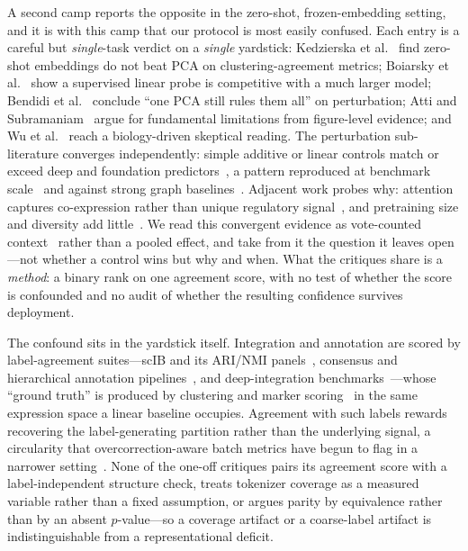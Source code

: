 \documentclass[fleqn,10pt,lineno]{wlpeerj}  %
\begin{document}
A second camp reports the opposite in the zero-shot, frozen-embedding setting, and it is with this camp that our protocol is most easily confused. Each entry is a careful but \emph{single}-task verdict on a \emph{single} yardstick: Kedzierska et al.~\cite{kedzierska2025} find zero-shot embeddings do not beat PCA on clustering-agreement metrics; Boiarsky et al.~\cite{boiarsky2024} show a supervised linear probe is competitive with a much larger model; Bendidi et al.~\cite{bendidi2024} conclude ``one PCA still rules them all'' on perturbation; Atti and Subramaniam~\cite{atti2025} argue for fundamental limitations from figure-level evidence; and Wu et al.~\cite{wu2025} reach a biology-driven skeptical reading. The perturbation sub-literature converges independently: simple additive or linear controls match or exceed deep and foundation predictors~\cite{wongpfizer2025,kernfeld2025,csendes2025,ahlmann2025}, a pattern reproduced at benchmark scale~\cite{perteval2024,scperturbench2025,systema2026} and against strong graph baselines~\cite{roohani2024}. Adjacent work probes why: attention captures co-expression rather than unique regulatory signal~\cite{kendiukhov2026}, and pretraining size and diversity add little~\cite{denadel2026}. We read this convergent evidence as vote-counted context~\cite{borenstein2009} rather than a pooled effect, and take from it the question it leaves open---not whether a control wins but why and when. What the critiques share is a \emph{method}: a binary rank on one agreement score, with no test of whether the score is confounded and no audit of whether the resulting confidence survives deployment.

The confound sits in the yardstick itself. Integration and annotation are scored by label-agreement suites---scIB and its ARI/NMI panels~\cite{luecken2022}, consensus and hierarchical annotation pipelines~\cite{popv2024,hce2026}, and deep-integration benchmarks~\cite{scibe2025}---whose ``ground truth'' is produced by clustering and marker scoring~\cite{wolf2018scanpy,stuart2019seurat} in the same expression space a linear baseline occupies. Agreement with such labels rewards recovering the label-generating partition rather than the underlying signal, a circularity that overcorrection-aware batch metrics have begun to flag in a narrower setting~\cite{rbet2025}. None of the one-off critiques pairs its agreement score with a label-independent structure check, treats tokenizer coverage as a measured variable rather than a fixed assumption, or argues parity by equivalence rather than by an absent $p$-value---so a coverage artifact or a coarse-label artifact is indistinguishable from a representational deficit.
\end{document}
